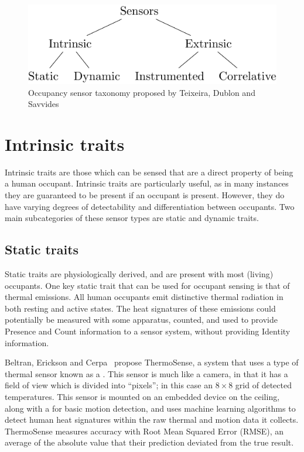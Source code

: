 \documentclass[../thesis/thesis.tex]{subfiles}
\begin{document}
\begin{figure}
\centering
\includegraphics{../diagrams/category-tree.pdf}
\caption{Occupancy sensor taxonomy proposed by Teixeira, Dublon and Savvides~\cite{teixeira2010survey}}
\label{fig:litreview:taxonomy}
\end{figure}

\section{Intrinsic traits}
\label{subsec:litreview:sensors:intrinsic}

Intrinsic traits are those which can be sensed that are a direct property of being a human occupant. Intrinsic traits are particularly useful, as in many instances they are guaranteed to be present if an occupant is present. However, they do have varying degrees of detectability and differentiation between occupants. Two main subcategories of these sensor types are static and dynamic traits.

\subsection{Static traits}
\label{subsubsec:litreview:sensors:intrinsic:static}
Static traits are physiologically derived, and are present with most (living) occupants. One key static trait that can be used for occupant sensing is that of thermal emissions. All human occupants emit distinctive thermal radiation in both resting and active states. The heat signatures of these emissions could potentially be measured with some apparatus, counted, and used to provide Presence and Count information to a sensor system, without providing Identity information.

Beltran, Erickson and Cerpa~\cite{beltran2013thermosense} propose ThermoSense, a system that uses a type of thermal sensor known as a \iar. This sensor is much like a camera, in that it has a field of view which is divided into ``pixels''; in this case an $8\times8$ grid of detected temperatures. This sensor is mounted on an embedded device on the ceiling, along with a \pir for basic motion detection, and uses machine learning algorithms to detect human heat signatures within the raw thermal and motion data it collects. ThermoSense measures accuracy with Root Mean Squared Error (RMSE), an average of the absolute value that their prediction deviated from the true result.
\end{document}
